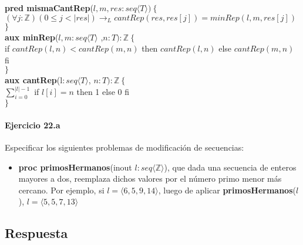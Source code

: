 \documentclass[a4paper]{article}
\begin{document}
			\textbf{pred mismaCantRep}($l,m,res:seq\langle T\rangle)
			\ \{$\smallskip \\
			\hspace*{6mm}$(\forall j:\mathbb{Z})(0\leq j<|res|)\rightarrow_L
			cantRep(res,res[j])=minRep(l,m,res[j])$\\
			\hspace*{5mm}$\}$\smallskip \\	
			
			\textbf{aux minRep}($l,m:seq\langle T\rangle$
				,$n:T ):\mathbb{Z}\ \{$\smallskip \\
			\hspace*{6mm}if $cantRep(l,n)<cantRep(m,n)$
				 then $cantRep(l,n)$ else $cantRep(m,n)$ fi\\
			\hspace*{5mm}$\}$\smallskip \\			
			
			\textbf{aux cantRep}(l$: seq\langle T\rangle$, $n:T):\mathbb{Z}
			\ \{$\smallskip \\
			\hspace*{6mm}$\sum_{i=0}^{|l|-1}$ if $l[i]=n$ then 1 else 0 fi\\
			\hspace*{5mm}$\}$\smallskip \\	

\paragraph*{Ejercicio 22.a} Especificar los siguientes problemas de modificación de secuencias:
	\begin{itemize}
		\item \textbf{proc primosHermanos}(inout $l:seq\langle \mathbb{Z}\rangle$), que dada una secuencia de enteros mayores a dos, reemplaza dichos valores por el número primo menor más cercano. Por ejemplo, si $l=\langle 6,5,9,14 \rangle$, luego de aplicar \textbf{primosHermanos}($l$), $l=\langle 5,5,7,13 \rangle$
	\end{itemize}
	
\subsection*{Respuesta}
			
\end{document}
